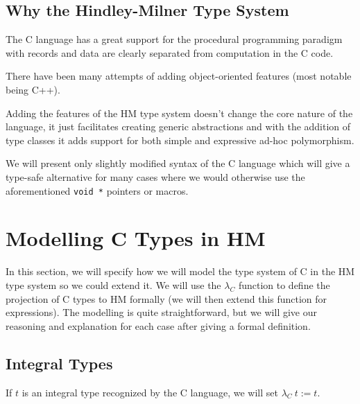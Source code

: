 \subsection{Why the Hindley-Milner Type System}

The C language has a great support for the procedural programming paradigm with records and data are clearly separated from computation in the C code.

There have been many attempts of adding object-oriented features (most notable being C++).

Adding the features of the HM type system doesn't change the core nature of the language, it just facilitates creating generic abstractions and with the addition of type classes it adds support for both simple and expressive ad-hoc polymorphism.

We will present only slightly modified syntax of the C language which will give a type-safe alternative for many cases where we would otherwise use the aforementioned \lstinline{void *} pointers or macros.

\iffalse
\section{C99 types}


All C types
\fi

\section{Modelling C Types in HM}

In this section, we will specify how we will model the type system of C in the HM type system so we could extend it. We will use the $\lambda_C$ function to define the projection of C types to HM formally (we will then extend this function for expressions). The modelling is quite straightforward, but we will give our reasoning and explanation for each case after giving a formal definition.

\subsection{Integral Types}

\begin{defn}
	If $t$ is an integral type recognized by the C language, we will set $\lambda_C\ t := t$.
\end{defn}

